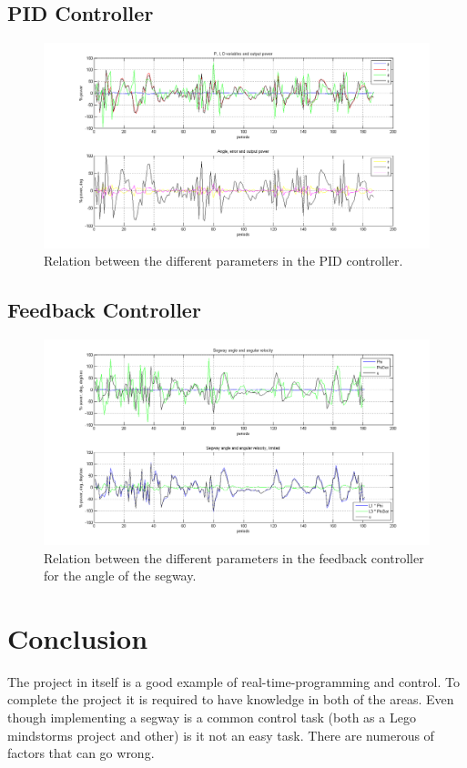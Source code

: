 \documentclass[a4paper]{article}
\begin{document}
\subsection{PID Controller}
\begin{figure}[H]
  \centering
\includegraphics[scale=0.45]{pic/pid.png}
\caption{Relation between the different parameters in the PID controller.}
\end{figure}

\subsection{Feedback Controller}
\begin{figure}[H]
  \centering
\includegraphics[scale=0.45]{pic/feedbackPlot.png}
\caption{Relation between the different parameters in the feedback controller for the angle of the segway.}
\end{figure}

\section{Conclusion}
The project in itself is a good example of real-time-programming and control. To complete the project it is required to have knowledge in both of the areas. Even though implementing a segway is a common control task (both as a Lego mindstorms project and other) is it not an easy task. There are numerous of factors that can go wrong.\\
\end{document}
